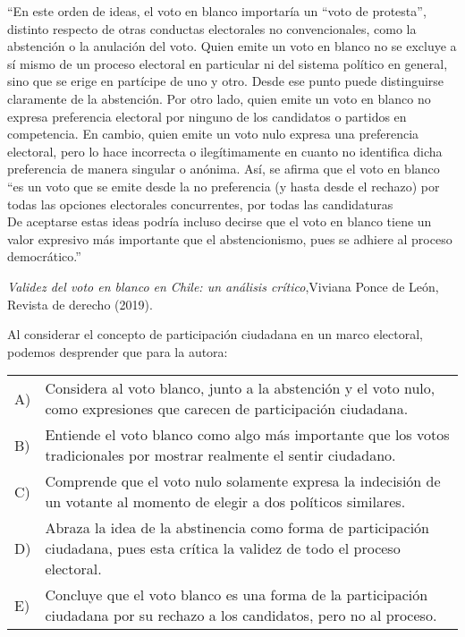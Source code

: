 \documentclass[letterpaper,11pt]{article}
\newcommand{\anchopregunta}{0.9\textwidth}
\begin{document}
\begin{enumerate}
\begin{minipage}{\anchopregunta}
\item ``En este orden de ideas, el voto en blanco importaría un “voto de protesta”, distinto respecto de otras conductas electorales no convencionales, como la abstención o la anulación del voto. Quien emite un voto en blanco no se excluye a sí mismo de un proceso electoral en particular ni del sistema político en general, sino que se erige en partícipe de uno y otro. Desde ese punto puede distinguirse claramente de la abstención. Por otro lado, quien emite un voto en blanco no expresa preferencia electoral por ninguno de los candidatos o partidos en competencia. En cambio, quien emite un voto nulo expresa una preferencia electoral, pero lo hace incorrecta o ilegítimamente en cuanto no identifica dicha preferencia de manera singular o anónima. Así, se afirma que el voto en blanco “es un voto que se emite desde la no preferencia (y hasta desde el rechazo) por todas las opciones electorales concurrentes, por todas las candidaturas\\De aceptarse estas ideas podría incluso decirse que el voto en blanco tiene un valor expresivo más importante que el abstencionismo, pues se adhiere al proceso democrático.''
\begin{flushright}
\textit{Validez del voto en blanco en Chile: un análisis crítico},Viviana Ponce de León, Revista de derecho (2019).
\end{flushright}
Al considerar el concepto de participación ciudadana en un marco electoral, podemos desprender que para la autora:
\begin{flushleft}\begin{tabular}{@{\hspace{-.001\textwidth}}l@{\hspace{2pt}}p{}}
A)& Considera al voto blanco, junto a la abstención y el voto nulo, como expresiones que carecen de participación ciudadana.\\
B)& Entiende el voto blanco como algo más importante que los votos tradicionales por mostrar realmente el sentir ciudadano.\\
C)& Comprende que el voto nulo solamente expresa la indecisión de un votante al momento de elegir a dos políticos similares.\\
D)& Abraza la idea de la abstinencia como forma de participación ciudadana, pues esta crítica la validez de todo el proceso electoral.\\
E)& Concluye que el voto blanco es una forma de la participación ciudadana por su rechazo a los candidatos, pero no al proceso.\\ 

\end{tabular}
\end{flushleft}
\end{minipage}
\end{enumerate}
\end{document}
